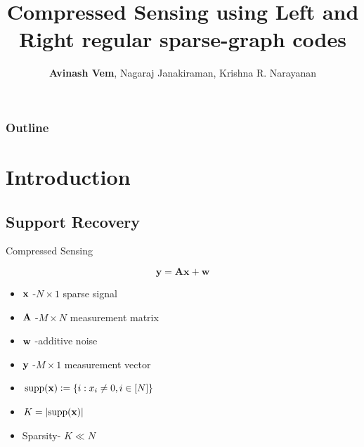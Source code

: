 \documentclass[10pt]{beamer}
\begin{document}
\title{\bf Compressed Sensing using Left and Right regular sparse-graph codes}
\author{\textbf{Avinash Vem}, Nagaraj Janakiraman, Krishna R. Narayanan} 
\vspace{10pt}


\date{} %
\frame{\titlepage}

\begin{frame}
	\frametitle{Outline}
	\tableofcontents
\end{frame}

\section{Introduction}
\subsection{Support Recovery}
\begin{frame}{Compressed Sensing}

\begin{equation*}
\mathbf{y=Ax +w}
\end{equation*}


\begin{itemize}
\item $\mathbf{x}$ -$N \times 1$ sparse signal
\item $\mathbf{A}$ -$M \times N$ measurement matrix
\item $\mathbf{w}$ -additive noise
\item $\mathbf{y}$ -$M \times 1$ measurement vector
\item $\text{supp}(\mathbf{x})\mathrel{\mathop:}= \{i: x_i\neq 0, i\in [N]\}$
\item $K=\lvert{\text{supp}(\mathbf{x})}\rvert$
\item Sparsity- $K\ll N$ 
\end{itemize}
\end{frame}
\end{document}
